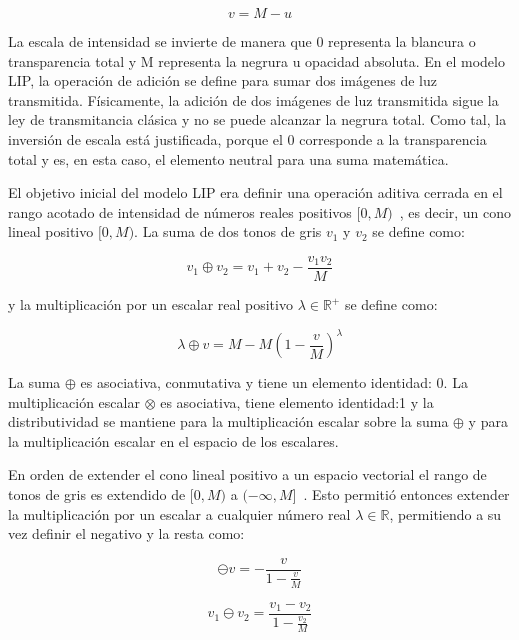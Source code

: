 \begin{equation}
	v = M - u
\end{equation}

La escala de intensidad se invierte de manera que 0 representa la blancura o transparencia total y M representa la negrura u opacidad absoluta. En el modelo LIP, la operación de adición se define para sumar dos imágenes de luz transmitida. Físicamente, la adición de dos imágenes de luz transmitida sigue la ley de transmitancia clásica y no se puede alcanzar la negrura total. Como tal, la inversión de escala está justificada, porque el 0 corresponde a la transparencia total y es, en esta caso, el elemento neutral para una suma matemática.

El objetivo inicial del modelo LIP era definir una operación aditiva cerrada en el rango acotado de intensidad de números reales positivos $[0, M)$~\cite{jourlin1988model}, es decir, un cono lineal positivo $[0, M )$. La suma de dos tonos de gris $v_1$ y $v_2$ se define como:

\begin{equation}
	v_1\oplus v_2=v_1+v_2-\frac{v_1v_2}{M}
\end{equation}

y la multiplicación por un escalar real positivo $\lambda \in \mathbb{R}^+$ se define como:

\begin{equation}
	\lambda \oplus v = M - M\left(1-\frac{v}{M}\right)^\lambda
\end{equation}

La suma $\oplus$ es asociativa, conmutativa y tiene un elemento identidad: 0. La multiplicaci\'on escalar $\otimes$ es asociativa, tiene elemento identidad:1 y la distributividad se mantiene para la multiplicación escalar sobre la suma $\oplus$ y para la multiplicación escalar en el espacio de los escalares.

En orden de extender el cono lineal positivo a un espacio vectorial el rango de tonos de gris es extendido de $[0,M)$ a $(-\infty,M]$~\cite{jourlin2016logarithmic}. Esto permiti\'o entonces extender la multiplicaci\'on por un escalar a cualquier n\'umero real $\lambda \in \mathbb{R}$, permitiendo a su vez definir el negativo y la resta como:

\begin{equation}
	\ominus v=-\frac{v}{1-\frac{v}{M}}
\end{equation}

\begin{equation}
	v_1 \ominus v_2 = \frac{v_1-v_2}{1-\frac{v_2}{M}}
\end{equation}

